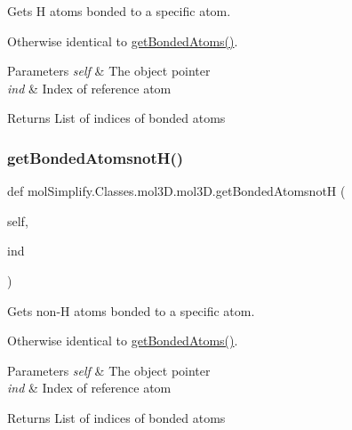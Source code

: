 Gets H atoms bonded to a specific atom. 

Otherwise identical to \hyperlink{classmolSimplify_1_1Classes_1_1mol3D_1_1mol3D_aac602cfe9499277393a3d23b55f71db0}{get\+Bonded\+Atoms()}. 
\begin{DoxyParams}{Parameters}
{\em self} & The object pointer \\
\hline
{\em ind} & Index of reference atom \\
\hline
\end{DoxyParams}
\begin{DoxyReturn}{Returns}
List of indices of bonded atoms 
\end{DoxyReturn}
\mbox{\label{classmolSimplify_1_1Classes_1_1mol3D_1_1mol3D_acda82e48cde5996f32a55e0acbdf052e}} 
\subsubsection{\texorpdfstring{get\+Bonded\+Atomsnot\+H()}{getBondedAtomsnotH()}}
{\footnotesize\ttfamily def mol\+Simplify.\+Classes.\+mol3\+D.\+mol3\+D.\+get\+Bonded\+AtomsnotH (\begin{DoxyParamCaption}\item[{}]{self,  }\item[{}]{ind }\end{DoxyParamCaption})}



Gets non-\/H atoms bonded to a specific atom. 

Otherwise identical to \hyperlink{classmolSimplify_1_1Classes_1_1mol3D_1_1mol3D_aac602cfe9499277393a3d23b55f71db0}{get\+Bonded\+Atoms()}. 
\begin{DoxyParams}{Parameters}
{\em self} & The object pointer \\
\hline
{\em ind} & Index of reference atom \\
\hline
\end{DoxyParams}
\begin{DoxyReturn}{Returns}
List of indices of bonded atoms 
\end{DoxyReturn}
\mbox{\label{classmolSimplify_1_1Classes_1_1mol3D_1_1mol3D_a054076c86f015de56353017cc391ba4c}} 
